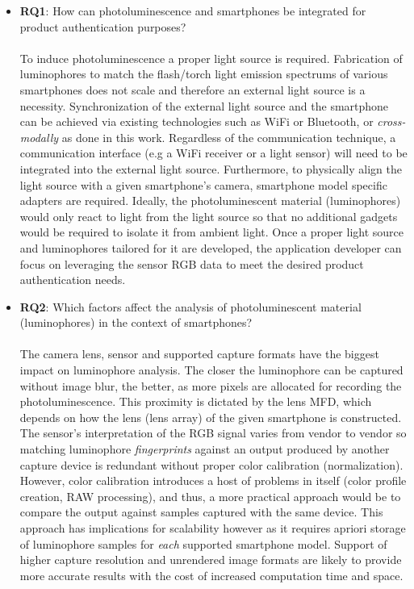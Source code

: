\documentclass[thesis.tex]{subfiles}
\begin{document}
\begin{itemize}[label=, leftmargin=*]
  \item \textbf{RQ1}: How can photoluminescence and smartphones be integrated for product authentication purposes?\\\\
  To induce photoluminescence a proper light source is required. Fabrication of luminophores to match the flash/torch light emission spectrums of various smartphones does not scale and therefore an external light source is a necessity. Synchronization of the external light source and the smartphone can be achieved via existing technologies such as WiFi or Bluetooth, or \emph{cross-modally} as done in this work. Regardless of the communication technique, a communication interface (e.g a WiFi receiver or a light sensor) will need to be integrated into the external light source. Furthermore, to physically align the light source with a given smartphone's camera, smartphone model specific adapters are required. Ideally, the photoluminescent material (luminophores) would only react to light from the light source so that no additional gadgets would be required to isolate it from ambient light. Once a proper light source and luminophores tailored for it are developed, the application developer can focus on leveraging the sensor RGB data to meet the desired product authentication needs.

  \item \textbf{RQ2}: Which factors affect the analysis of photoluminescent material (luminophores) in the context of smartphones?\\\\
  The camera lens, sensor and supported capture formats have the biggest impact on luminophore analysis. The closer the luminophore can be captured without image blur, the better, as more pixels are allocated for recording the photoluminescence. This proximity is dictated by the lens MFD, which depends on how the lens (lens array) of the given smartphone is constructed. The sensor's interpretation of the RGB signal varies from vendor to vendor so matching luminophore \emph{fingerprints} against an output produced by another capture device is redundant without proper color calibration (normalization). However, color calibration introduces a host of problems in itself (color profile creation, RAW processing), and thus, a more practical approach would be to compare the output against samples captured with the same device. This approach has implications for scalability however as it requires apriori storage of luminophore samples for \emph{each} supported smartphone model. Support of higher capture resolution and unrendered image formats are likely to provide more accurate results with the cost of increased computation time and space.


\end{itemize}
\end{document}
